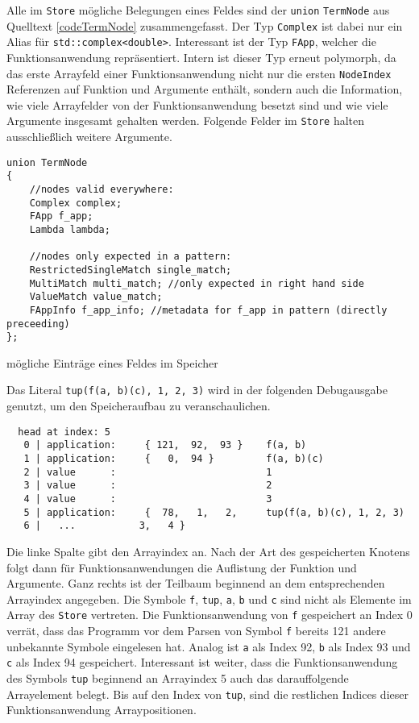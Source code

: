 Alle im \verb|Store| mögliche Belegungen eines Feldes sind der \verb|union| \verb|TermNode| aus Quelltext \ref{codeTermNode} zusammengefasst. Der Typ \verb|Complex| ist dabei nur ein Alias für \verb|std::complex<double>|. Interessant ist der Typ \verb|FApp|, welcher die Funktionsanwendung repräsentiert. Intern ist dieser Typ erneut polymorph, da das erste Arrayfeld einer Funktionsanwendung nicht nur die ersten \verb|NodeIndex| Referenzen auf Funktion und Argumente enthält, sondern auch die Information, wie viele Arrayfelder von der Funktionsanwendung besetzt sind und wie viele Argumente insgesamt gehalten werden. Folgende Felder im \verb|Store| halten ausschließlich weitere Argumente.


\begin{listing}
\footnotesize
\begin{verbatim}
union TermNode 
{
    //nodes valid everywhere:
    Complex complex;
    FApp f_app;
    Lambda lambda;
    
    //nodes only expected in a pattern:
    RestrictedSingleMatch single_match;
    MultiMatch multi_match; //only expected in right hand side
    ValueMatch value_match;
    FAppInfo f_app_info; //metadata for f_app in pattern (directly preceeding)
};
\end{verbatim}
\caption{mögliche Einträge eines Feldes im Speicher}
\label{codeTermNode}
\end{listing}



\begin{beispiel} \label{bspREPLliteral}
Das Literal \verb|tup(f(a, b)(c), 1, 2, 3)| wird in der folgenden Debugausgabe genutzt, um den Speicheraufbau zu veranschaulichen.
\begin{unbreakable}
\begin{verbatim}
  head at index: 5
   0 | application:     { 121,  92,  93 }    f(a, b)
   1 | application:     {   0,  94 }         f(a, b)(c)
   2 | value      :                          1
   3 | value      :                          2
   4 | value      :                          3
   5 | application:     {  78,   1,   2,     tup(f(a, b)(c), 1, 2, 3)
   6 |   ...           3,   4 }
\end{verbatim}
\end{unbreakable}
Die linke Spalte gibt den Arrayindex an. Nach der Art des gespeicherten Knotens folgt dann für Funktionsanwendungen die Auflistung der Funktion und Argumente. Ganz rechts ist der Teilbaum beginnend an dem entsprechenden Arrayindex angegeben. Die Symbole \verb|f|, \verb|tup|, \verb|a|, \verb|b| und \verb|c| sind nicht als Elemente im Array des \verb|Store| vertreten. Die Funktionsanwendung von \verb|f| gespeichert an Index 0 verrät, dass das Programm vor dem Parsen von Symbol \verb|f| bereits 121 andere unbekannte Symbole eingelesen hat. Analog ist \verb|a| als Index 92, \verb|b| als Index 93 und \verb|c| als Index 94 gespeichert. 
Interessant ist weiter, dass die Funktionsanwendung des Symbols \verb|tup| beginnend an Arrayindex 5 auch das darauffolgende Arrayelement belegt. Bis auf den Index von \verb|tup|, sind die restlichen Indices dieser Funktionsanwendung Arraypositionen. 
\end{beispiel}


